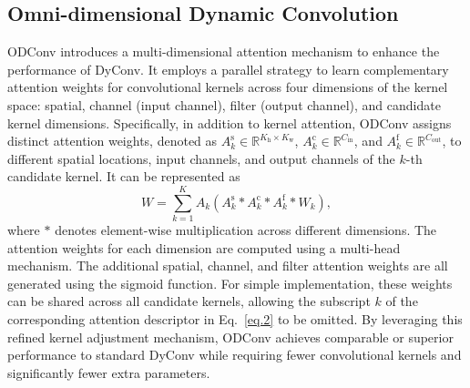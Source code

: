 \subsection{Omni-dimensional Dynamic Convolution \label{sec2.2}}
ODConv \cite{li2022odconv} introduces a multi-dimensional attention mechanism to enhance the performance of DyConv. It employs a parallel strategy to learn complementary attention weights for convolutional kernels across four dimensions of the kernel space: spatial, channel (input channel), filter (output channel), and candidate kernel dimensions. Specifically, in addition to kernel attention, ODConv assigns distinct attention weights, denoted as $A_k^\text{s} \in \mathbb{R}^{K_\text{h} \times K_\text{w}}$, $A_k^\text{c} \in \mathbb{R}^{C_{\text{in}}}$, and $A_k^\text{f} \in \mathbb{R}^{C_{\text{out}}}$, to different spatial locations, input channels, and output channels of the $k$-th candidate kernel. It can be represented as
\begin{equation}
    W = \sum_{k=1}^{K} A_k \left( A_k^\text{s} * A_k^\text{c} * A_k^\text{f} * W_k \right),
    \label{eq.2}
\end{equation}
where $*$ denotes element-wise multiplication across different dimensions. The attention weights for each dimension are computed using a multi-head mechanism. The additional spatial, channel, and filter attention weights are all generated using the sigmoid function. For simple implementation, these weights can be shared across all candidate kernels, allowing the subscript $k$ of the corresponding attention descriptor in Eq.~\ref{eq.2} to be omitted. By leveraging this refined kernel adjustment mechanism, ODConv achieves comparable or superior performance to standard DyConv while requiring fewer convolutional kernels and significantly fewer extra parameters.